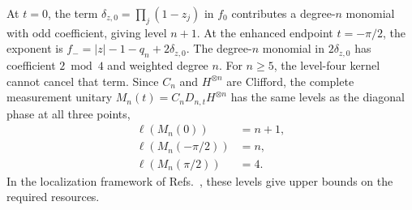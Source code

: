 At $t=0$, the term $\delta_{z,0}=\prod_j(1-z_j)$ in $f_0$ contributes a degree-$n$ monomial with odd coefficient, giving level $n+1$. At the enhanced endpoint $t=-\pi/2$, the exponent is $f_-=|z|-1-q_n+2\delta_{z,0}$. The degree-$n$ monomial in $2\delta_{z,0}$ has coefficient $2\bmod4$ and weighted degree $n$. For $n\ge5$, the level-four kernel cannot cancel that term. Since $C_n$ and $H^{\otimes n}$ are Clifford, the complete measurement unitary $M_n(t)=C_nD_{n,t}H^{\otimes n}$ has the same levels as the diagonal phase at all three points,
\begin{equation}
 \begin{aligned}
 \ell(M_n(0))&=n+1,\\
 \ell(M_n(-\pi/2))&=n,\\
 \ell(M_n(\pi/2))&=4.
 \end{aligned}
 \label{physics:levels}
\end{equation}
In the localization framework of Refs.~\cite{PauwelsLocalization2025,PauwelsGisin2026}, these levels give upper bounds on the required resources.
